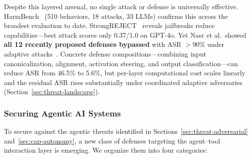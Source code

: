 Despite this layered arsenal, no single attack or defense is universally effective. HarmBench~\cite{mazeika2024harmbench} (510 behaviors, 18 attacks, 33 LLMs) confirms this across the broadest evaluation to date. StrongREJECT~\cite{souly2024strongreject} reveals jailbreaks reduce capabilities---best attack scores only 0.37/1.0 on GPT-4o. Yet Nasr et al.\ showed \textbf{all 12 recently proposed defenses bypassed} with ASR $>$90\% under adaptive attacks~\cite{nasr2025attacker}. Concrete defense compositions---combining input canonicalization, alignment, activation steering, and output classification---can reduce ASR from 46.5\% to 5.6\%, but per-layer computational cost scales linearly and the residual ASR rises substantially under coordinated adaptive adversaries (Section~\ref{sec:threat-landscape}).


\subsubsection{Securing Agentic AI Systems}
\label{sec:agentic-security}


To secure against the agentic threats identified in Sections~\ref{sec:threat-adversarial} and~\ref{sec:cap-autonomy}, a new class of defenses targeting the agent--tool interaction layer is emerging. We organize them into four categories:


